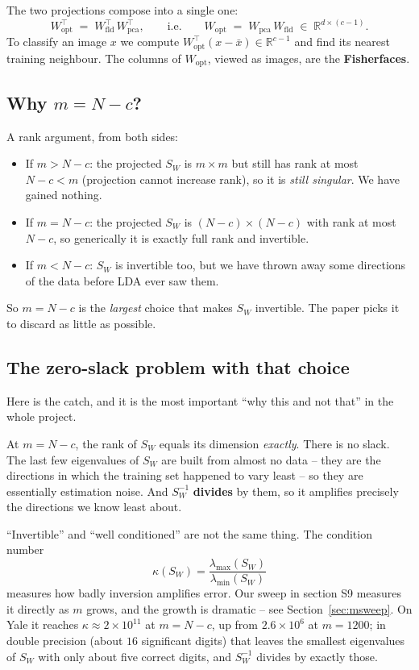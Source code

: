 \documentclass[11pt]{article}
\theoremstyle{definition}
\theoremstyle{remark}
\newcommand{\Sw}{S_W}
\newcommand{\R}{\mathbb{R}}
\begin{document}
The two projections compose into a single one:
\[
  W_{\text{opt}}^{\!\top} \;=\; W_{\text{fld}}^{\!\top}\,W_{\text{pca}}^{\!\top},
  \qquad\text{i.e.}\qquad
  W_{\text{opt}} \;=\; W_{\text{pca}}\,W_{\text{fld}} \;\in\; \R^{d\times(c-1)}.
\]
To classify an image $x$ we compute $W_{\text{opt}}^{\!\top}(x-\bar{x})\in\R^{c-1}$ and find
its nearest training neighbour. The columns of $W_{\text{opt}}$, viewed as images,
are the \textbf{Fisherfaces}.

\subsection{Why \texorpdfstring{$m=N-c$}{m = N-c}?}

A rank argument, from both sides:
\begin{itemize}[nosep]
\item If $m > N-c$: the projected $\Sw$ is $m\times m$ but still has rank at most
  $N-c < m$ (projection cannot increase rank), so it is \emph{still singular}. We
  have gained nothing.
\item If $m = N-c$: the projected $\Sw$ is $(N-c)\times(N-c)$ with rank at most
  $N-c$, so generically it is exactly full rank and invertible.
\item If $m < N-c$: $\Sw$ is invertible too, but we have thrown away some
  directions of the data before LDA ever saw them.
\end{itemize}
So $m=N-c$ is the \emph{largest} choice that makes $\Sw$ invertible. The paper
picks it to discard as little as possible.

\subsection{The zero-slack problem with that choice}\label{sec:zeroslack}

Here is the catch, and it is the most important ``why this and not that'' in the
whole project.

At $m=N-c$, the rank of $\Sw$ equals its dimension \emph{exactly}. There is no
slack. The last few eigenvalues of $\Sw$ are built from almost no data -- they are
the directions in which the training set happened to vary least -- so they are
essentially estimation noise. And $\Sw^{-1}$ \textbf{divides} by them, so it
amplifies precisely the directions we know least about.

``Invertible'' and ``well conditioned'' are not the same thing. The condition
number
\[
  \kappa(\Sw) = \frac{\lambda_{\max}(\Sw)}{\lambda_{\min}(\Sw)}
\]
measures how badly inversion amplifies error. Our sweep in section S9 measures it
directly as $m$ grows, and the growth is dramatic -- see Section~\ref{sec:msweep}.
On Yale it reaches $\kappa \approx 2\times10^{11}$ at $m=N-c$, up from
$2.6\times10^{6}$ at $m=1200$; in double precision (about $16$ significant digits)
that leaves the smallest eigenvalues of $\Sw$ with only about five correct digits,
and $\Sw^{-1}$ divides by exactly those.
\end{document}
